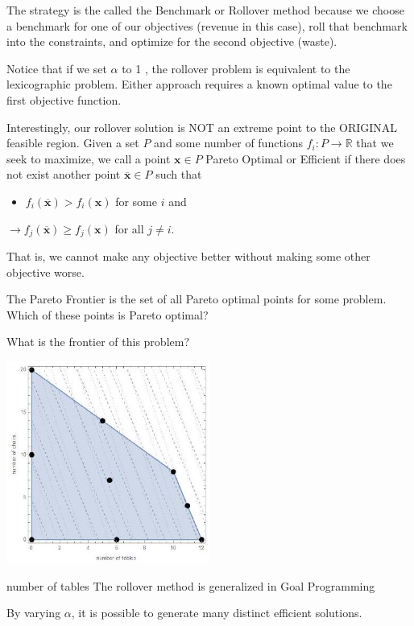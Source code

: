 The strategy is the called the Benchmark or Rollover method because we choose a benchmark for one of our objectives (revenue in this case), roll that benchmark into the constraints, and optimize for the second objective (waste).

Notice that if we set $\alpha$ to 1 , the rollover problem is equivalent to the lexicographic problem. Either approach requires a known optimal value to the first objective function.

Interestingly, our rollover solution is NOT an extreme point to the ORIGINAL feasible region. Given a set $P$ and some number of functions $f_{i}: P \rightarrow \mathbb{R}$ that we seek to maximize, we call a point $\mathbf{x} \in P$ Pareto Optimal or Efficient if there does not exist another point $\overline{\mathbf{x}} \in P$ such that

\begin{itemize}
  \item $f_{i}(\overline{\mathbf{x}})>f_{i}(\mathbf{x})$ for some $i$ and
\end{itemize}
$\rightarrow f_{j}(\overline{\mathbf{x}}) \geq f_{j}(\mathbf{x})$ for all $j \neq i$.

That is, we cannot make any objective better without making some other objective worse.

The Pareto Frontier is the set of all Pareto optimal points for some problem. Which of these points is Pareto optimal?

What is the frontier of this problem?

\includegraphics[width=0.5\textwidth]{optimization/multi-objective/images/2022_02_28_634e8079070800ac7e3cg-13}

number of tables The rollover method is generalized in Goal Programming

By varying $\alpha$, it is possible to generate many distinct efficient solutions.

